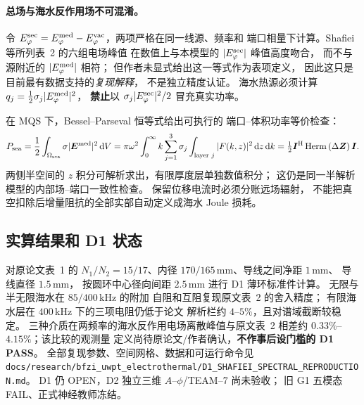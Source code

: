 \paragraph{总场与海水反作用场不可混淆。}
令 $E^{\rm sec}_\varphi=E^{\rm med}_\varphi-
E^{\rm vac}_\varphi$，两项严格在同一线源、频率和
端口相量下计算。Shafiei 等所列表~2 的六组电场峰值
在数值上与本模型的 $|E^{\rm sec}_\varphi|$ 峰值高度吻合，
而不与源附近的 $|E^{\rm med}_\varphi|$ 相符；
但作者未显式给出这一等式作为表项定义，
因此这只是目前最有数据支持的\emph{复现解释}，
不是独立精度认证。
海水热源必须计算
$q_j=\tfrac12\sigma_j|E^{\rm med}_\varphi|^2$，
\textbf{禁止}以 $\sigma_j|E^{\rm sec}_\varphi|^2/2$
冒充真实功率。

在 MQS 下，Bessel--Parseval 恒等式给出可执行的
端口--体积功率等价检查：
\begin{equation}
P_{\rm sea}
=\frac12\int_{\Omega_{\rm sea}}\sigma|\bm E^{\rm med}|^2\,\mathrm dV
=\pi\omega^2\int_0^\infty k\sum_{j=1}^3
\sigma_j\int_{\text{layer }j}|F(k,z)|^2\,\mathrm dz\,\mathrm dk
=\tfrac12\bm I^{\rm H}\operatorname{Herm}\left(\Delta\bm Z\right)\bm I.
\end{equation}
两侧半空间的 $z$ 积分可解析求出，有限厚度层单独数值积分；
这仍是同一半解析模型的内部场--端口一致性检查。
保留位移电流时必须分账远场辐射，
不能把真空扣除后增量阻抗的全部实部自动定义成海水 Joule 损耗。

\subsection{实算结果和 D1 状态}
对原论文表~1 的 $N_1/N_2=15/17$、内径
$170/165\,$mm、导线之间净距 $1\,$mm、
导线直径 $1.5\,$mm，
按圆环中心径向间距 $2.5\,$mm 进行 D1 薄环标准件计算。
无限与半无限海水在 $85/400\,$kHz 的附加
自阻和互阻复现原文表~2 的舍入精度；
有限海水层在 $400\,$kHz 下的三项电阻仍低于论文
解析栏约 $4$--$5\%$，且对谱域截断较稳定。
三种介质在两频率的海水反作用电场离散峰值与原文表~2
相差约 $0.33\%$--$4.15\%$；该比较的观测量
定义尚待原论文/作者确认，\textbf{不作事后设门槛的 D1 PASS}。
全部复现参数、空间网格、数据和可运行命令见
\texttt{docs/research/bfzi\_uwpt\_electrothermal/D1\_SHAFIEI\_SPECTRAL\_REPRODUCTION.md}。
D1 仍 OPEN，D2 独立三维 $A$--$\phi$/TEAM--7 尚未验收；
旧 G1 五模态 FAIL、正式神经教师冻结。
